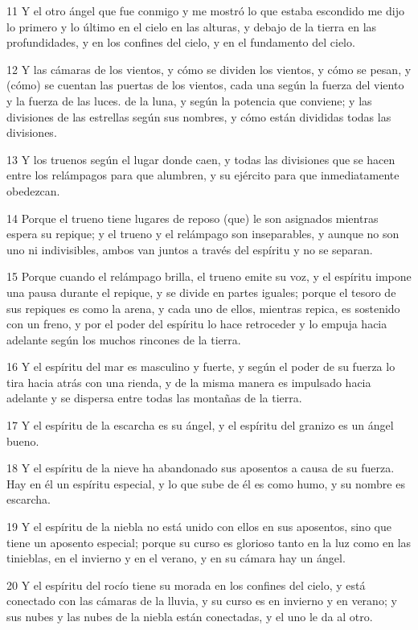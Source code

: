 \par 11 Y el otro ángel que fue conmigo y me mostró lo que estaba escondido me dijo lo primero y lo último en el cielo en las alturas, y debajo de la tierra en las profundidades, y en los confines del cielo, y en el fundamento del cielo.
\par 12 Y las cámaras de los vientos, y cómo se dividen los vientos, y cómo se pesan, y (cómo) se cuentan las puertas de los vientos, cada una según la fuerza del viento y la fuerza de las luces. de la luna, y según la potencia que conviene; y las divisiones de las estrellas según sus nombres, y cómo están divididas todas las divisiones.
\par 13 Y los truenos según el lugar donde caen, y todas las divisiones que se hacen entre los relámpagos para que alumbren, y su ejército para que inmediatamente obedezcan.
\par 14 Porque el trueno tiene lugares de reposo (que) le son asignados mientras espera su repique; y el trueno y el relámpago son inseparables, y aunque no son uno ni indivisibles, ambos van juntos a través del espíritu y no se separan.
\par 15 Porque cuando el relámpago brilla, el trueno emite su voz, y el espíritu impone una pausa durante el repique, y se divide en partes iguales; porque el tesoro de sus repiques es como la arena, y cada uno de ellos, mientras repica, es sostenido con un freno, y por el poder del espíritu lo hace retroceder y lo empuja hacia adelante según los muchos rincones de la tierra.
\par 16 Y el espíritu del mar es masculino y fuerte, y según el poder de su fuerza lo tira hacia atrás con una rienda, y de la misma manera es impulsado hacia adelante y se dispersa entre todas las montañas de la tierra.
\par 17 Y el espíritu de la escarcha es su ángel, y el espíritu del granizo es un ángel bueno.
\par 18 Y el espíritu de la nieve ha abandonado sus aposentos a causa de su fuerza. Hay en él un espíritu especial, y lo que sube de él es como humo, y su nombre es escarcha.
\par 19 Y el espíritu de la niebla no está unido con ellos en sus aposentos, sino que tiene un aposento especial; porque su curso es glorioso tanto en la luz como en las tinieblas, en el invierno y en el verano, y en su cámara hay un ángel.
\par 20 Y el espíritu del rocío tiene su morada en los confines del cielo, y está conectado con las cámaras de la lluvia, y su curso es en invierno y en verano; y sus nubes y las nubes de la niebla están conectadas, y el uno le da al otro.
